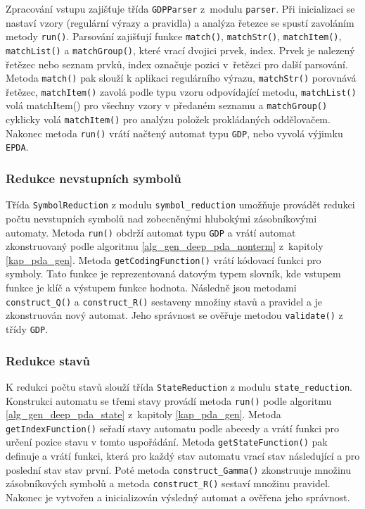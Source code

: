 Zpracování vstupu zajišťuje třída \texttt{GDPParser} z~modulu \texttt{parser}. 
Při inicializaci se nastaví vzory (regulární výrazy a pravidla) a analýza řetezce se spustí zavoláním metody \texttt{run()}. Parsování zajišťují funkce \texttt{match()}, \texttt{matchStr()}, \texttt{matchItem()}, \texttt{matchList()} a \texttt{matchGroup()}, které vrací dvojici prvek, index. Prvek je nalezený řetězec nebo seznam prvků, index označuje pozici v~řetězci pro další parsování. Metoda \texttt{match()} pak slouží k aplikaci regulárního výrazu, \texttt{matchStr()} porovnává řetězec, \texttt{matchItem()} zavolá podle typu vzoru odpovídající metodu, \texttt{matchList()} volá matchItem() pro všechny vzory v předaném seznamu a \texttt{matchGroup()} cyklicky volá \texttt{matchItem()} pro analýzu položek prokládaných oddělovačem. Nakonec metoda \texttt{run()} vrátí načtený automat typu \texttt{GDP}, nebo vyvolá výjimku \texttt{EPDA}.

\subsubsection{Redukce nevstupních symbolů}

Třída \texttt{SymbolReduction} z modulu \texttt{symbol\_reduction} umožňuje provádět redukci počtu nevstupních symbolů nad zobecněnými hlubokými zásobníkovými automaty. Metoda \texttt{run()} obdrží automat typu \texttt{GDP} a vrátí automat zkonstruovaný podle algoritmu \ref{alg_gen_deep_pda_nonterm} z~kapitoly \ref{kap_pda_gen}.
Metoda \texttt{getCodingFunction()} vrátí kódovací funkci pro symboly. Tato funkce je reprezentovaná datovým typem slovník, kde vstupem funkce je klíč a výstupem funkce hodnota. Následně jsou metodami \texttt{construct\_Q()} a \texttt{construct\_R()} sestaveny množiny stavů a pravidel a je zkonstruován nový automat. Jeho správnost se ověřuje metodou \texttt{validate()} z třídy \texttt{GDP}.

\subsubsection{Redukce stavů}

K redukci počtu stavů slouží třída \texttt{StateReduction} z modulu \texttt{state\_reduction}. Konstrukci automatu se třemi stavy provádí metoda \texttt{run()} podle algoritmu \ref{alg_gen_deep_pda_state} z~kapitoly \ref{kap_pda_gen}. Metoda \texttt{getIndexFunction()} seřadí stavy automatu podle abecedy a vrátí funkci pro určení pozice stavu v tomto uspořádání. Metoda \texttt{getStateFunction()} pak definuje a vrátí funkci, která pro každý stav automatu vrací stav následující a pro poslední stav stav první. Poté metoda \texttt{construct\_Gamma()} zkonstruuje množinu zásobníkových symbolů a metoda \texttt{construct\_R()} sestaví množinu pravidel. Nakonec je vytvořen a inicializován výsledný automat a ověřena jeho správnost.

